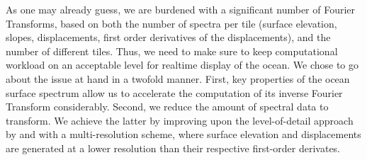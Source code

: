 As one may already guess, we are burdened with a significant number of
Fourier Transforms, based on both the number of spectra per tile (surface elevation,
slopes, displacements, first order derivatives of the displacements),
and the number of different tiles.
Thus, we need to make sure to keep computational workload on an acceptable level
for realtime display of the ocean. We chose to go about the issue at hand in a
twofold manner.
First, key properties of the ocean surface spectrum allow us to accelerate the
computation of its inverse Fourier Transform considerably.
Second, we reduce the amount of spectral data to transform. We achieve the
latter by improving upon the level-of-detail approach by \citet{misc:oceanlightingfft}
and \citet{article:whitecaps} with a multi-resolution scheme, where surface
elevation and displacements are generated at a lower resolution
than their respective first-order derivates.




